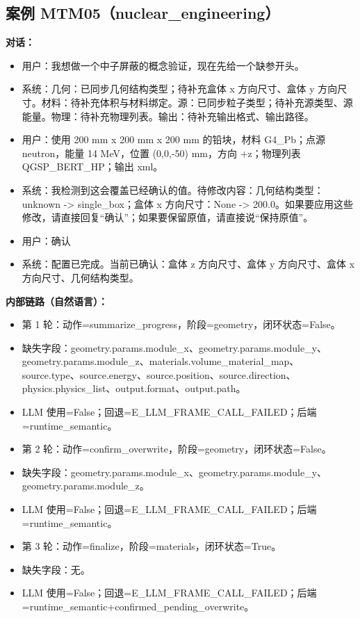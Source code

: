 \documentclass[11pt]{ctexart}
\begin{document}
\subsection{案例 MTM05（nuclear\_engineering）}
\textbf{对话：}
\begin{itemize}
\item 用户：我想做一个中子屏蔽的概念验证，现在先给一个缺参开头。
\item 系统：几何：已同步几何结构类型；待补充盒体 x 方向尺寸、盒体 y 方向尺寸。材料：待补充体积与材料绑定。源：已同步粒子类型；待补充源类型、源能量。物理：待补充物理列表。输出：待补充输出格式、输出路径。
\item 用户：使用 200 mm x 200 mm x 200 mm 的铅块，材料 G4\_Pb；点源 neutron，能量 14 MeV，位置 (0,0,-50) mm，方向 +z；物理列表 QGSP\_BERT\_HP；输出 xml。
\item 系统：我检测到这会覆盖已经确认的值。待修改内容：几何结构类型：unknown -> single\_box；盒体 x 方向尺寸：None -> 200.0。如果要应用这些修改，请直接回复“确认”；如果要保留原值，请直接说“保持原值”。
\item 用户：确认
\item 系统：配置已完成。当前已确认：盒体 z 方向尺寸、盒体 y 方向尺寸、盒体 x 方向尺寸、几何结构类型。
\end{itemize}
\textbf{内部链路（自然语言）：}
\begin{itemize}
\item 第 1 轮：动作=summarize\_progress，阶段=geometry，闭环状态=False。
\item 缺失字段：geometry.params.module\_x、geometry.params.module\_y、geometry.params.module\_z、materials.volume\_material\_map、source.type、source.energy、source.position、source.direction、physics.physics\_list、output.format、output.path。
\item LLM 使用=False；回退=E\_LLM\_FRAME\_CALL\_FAILED；后端=runtime\_semantic。
\item 第 2 轮：动作=confirm\_overwrite，阶段=geometry，闭环状态=False。
\item 缺失字段：geometry.params.module\_x、geometry.params.module\_y、geometry.params.module\_z。
\item LLM 使用=False；回退=E\_LLM\_FRAME\_CALL\_FAILED；后端=runtime\_semantic。
\item 第 3 轮：动作=finalize，阶段=materials，闭环状态=True。
\item 缺失字段：无。
\item LLM 使用=False；回退=E\_LLM\_FRAME\_CALL\_FAILED；后端=runtime\_semantic+confirmed\_pending\_overwrite。
\end{itemize}
\end{document}
